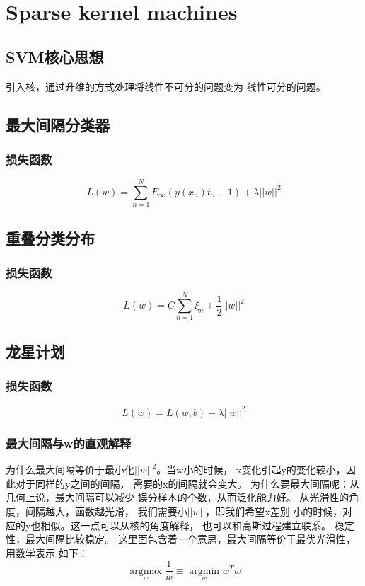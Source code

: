 \chapter{Sparse kernel machines}
\section{SVM核心思想}
引入核，通过升维的方式处理将线性不可分的问题变为
线性可分的问题。

\section{最大间隔分类器}
\subsection{损失函数}
\begin{equation}
L(w) = \sum_{n=1}^N E_\infty(y(x_n)t_n - 1) + \lambda||w||^2
\end{equation}
\section{重叠分类分布}

\subsection{损失函数}
\begin{equation}
L(w) = C\sum_{n=1}^N\xi_n + \frac{1}{2}||w||^2
\end{equation}

\section{龙星计划}
\subsection{损失函数}
\begin{equation} 
L(w) = L(w, b) + \lambda||w||^2
\end{equation}

\subsection{最大间隔与w的直观解释}
为什么最大间隔等价于最小化$||w||^2$。当w小的时候，
x变化引起y的变化较小，因此对于同样的y之间的间隔，
需要的x的间隔就会变大。
为什么要最大间隔呢：从几何上说，最大间隔可以减少
误分样本的个数，从而泛化能力好。
从光滑性的角度，间隔越大，函数越光滑，
我们需要小$||w||$，即我们希望x差别
小的时候，对应的y也相似。这一点可以从核的角度解释，
也可以和高斯过程建立联系。
稳定性，最大间隔比较稳定。
这里面包含着一个意思，最大间隔等价于最优光滑性，用数学表示
如下：
\begin{equation}
\underset{w}{\operatorname{arg max}}\frac{1}{w}
\equiv \underset{w}{\operatorname{arg min}}w^Tw
\end{equation}

